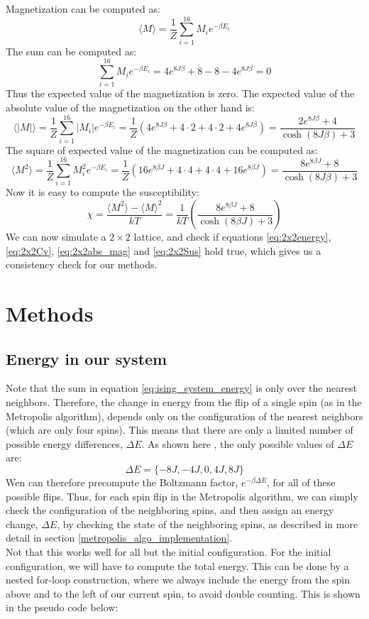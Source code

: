 \documentclass[a4paper, 10pt]{article}
\begin{document}
Magnetization can be computed as:
$$\langle M \rangle=\frac{1}{Z}\sum_{i=1}^{16}M_ie^{-\beta E_i}$$
The sum can be computed as:
$$\sum_{i=1}^{16}M_ie^{-\beta E_i}=4e^{8J\beta}+8-8-4e^{8J\beta}=0$$
Thus the expected value of the magnetization is zero. The expected value of the absolute value of the magnetization on the other hand is:
\begin{equation}\label{eq:2x2abs_mag}
\langle |M|\rangle =\frac{1}{Z}\sum_{i=1}^{16}|M_i|e^{-\beta E_i}=\frac{1}{Z}\left( 4e^{8J\beta}+4\cdot 2+ 4\cdot 2 +4e^{8J\beta}\right)=\frac{2e^{8J\beta}+4}{\cosh(8J\beta)+3}
\end{equation}
The square of expected value of the magnetization can be computed as:
$$\langle M^2 \rangle = \frac{1}{Z}\sum_{i=1}^{16}M_i^2e^{-\beta E_i}=\frac{1}{Z}\left(16e^{8\beta J}+4\cdot 4+4\cdot 4+16e^{8\beta J}\right)=\frac{8e^{8\beta J}+8}{\cosh(8J\beta)+3}$$
Now it is easy to compute the susceptibility:
\begin{equation}\label{eq:2x2Sus}
\chi = \frac{\langle M^2\rangle - \langle M \rangle^2}{kT}=\frac{1}{kT}\left(\frac{8e^{8\beta J}+8}{\cosh(8\beta J)+3}\right)
\end{equation}
We can now simulate a $2\times 2$ lattice, and check if equations \ref{eq:2x2energy}, \ref{eq:2x2Cv}, \ref{eq:2x2abs_mag} and \ref{eq:2x2Sus} hold true, which gives us a consistency check for our methods.
\newpage
\section{Methods}
\subsection{Energy in our system}\label{energy_in_system}
Note that the sum in equation \ref{eq:ising_system_energy} is only over the nearest neighbors. Therefore, the change in energy from the flip of a single spin (as in the Metropolis algorithm), depends only on the configuration of the nearest neighbors (which are only four spins). This means that there are only a limited number of possible energy differences, $\Delta E$. As shown here \cite{Metropolis}, the only possible values of $\Delta E$ are:
$$\Delta E = \{ -8J, -4J, 0, 4J, 8J\}$$
Wen can therefore precompute the Boltzmann factor, $e^{-\beta \Delta E}$, for all of these possible flips. Thus, for each spin flip in the Metropolis algorithm, we can simply check the configuration of the neighboring spins, and then assign an energy change, $\Delta E$, by checking the state of the neighboring spins, as described in more detail in section \ref{metropolis_algo_implementation}.\\
\linebreak
Not that this works well for all but the initial configuration. For the initial configuration, we will have to compute the total energy. This can be done by a nested for-loop construction, where we always include the energy from the spin above and to the left of our current spin, to avoid double counting. This is shown in the pseudo code below:

\end{document}
